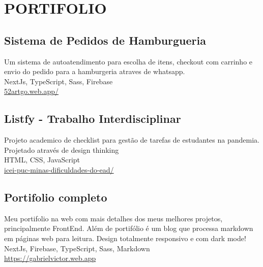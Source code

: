 

  \section{PORTIFOLIO}
  \small\subsection{Sistema de Pedidos de Hamburgueria}
  Um sistema de autoatendimento para escolha de itens, checkout com carrinho e envio do pedido para a hamburgeria atraves de whatsapp.\\
  \footnotesize{NextJs, TypeScript, Sass, Firebase}\\
  \href{https://52artgo.web.app/}{52artgo.web.app/}

  \small\subsection{Listfy - Trabalho Interdisciplinar}
  Projeto academico de checklist para gestão de tarefas de estudantes na pandemia. Projetado através de design thinking\\
  \footnotesize{HTML, CSS, JavaScript}\\
  \href{https://icei-puc-minas-pples-ti.github.io/plf-es-2021-1-ti1-7924100-dificuldades-do-ead/}{icei-puc-minas-dificuldades-do-ead/}

  \small\subsection{Portifolio completo}
  Meu portifolio na web com mais detalhes dos meus melhores projetos, principalmente FrontEnd. Além de portifólio é um blog que processa markdown em páginas web para leitura. Design totalmente responsivo e com dark mode!  \\
  \footnotesize{NextJs, Firebase, TypeScript, Sass, Markdown}\\
  \href{https://gabrielvictor.web.app}{https://gabrielvictor.web.app}

